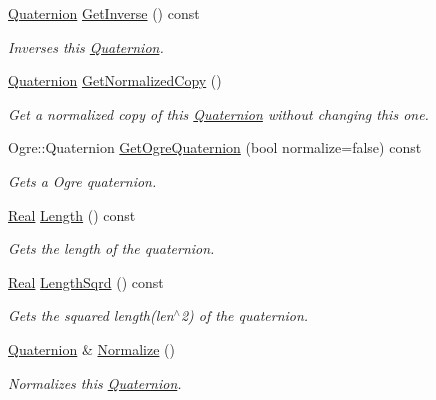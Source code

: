 \begin{DoxyCompactItemize}
\hyperlink{classMezzanine_1_1Quaternion}{Quaternion} \hyperlink{classMezzanine_1_1Quaternion_a37552234f4b725e17eedf584e011f36e}{GetInverse} () const 
\begin{DoxyCompactList}\small\item\em Inverses this \hyperlink{classMezzanine_1_1Quaternion}{Quaternion}. \item\end{DoxyCompactList}\item 
\hyperlink{classMezzanine_1_1Quaternion}{Quaternion} \hyperlink{classMezzanine_1_1Quaternion_ad5e76fba4c8b988be5865ec6ce2bbdd8}{GetNormalizedCopy} ()
\begin{DoxyCompactList}\small\item\em Get a normalized copy of this \hyperlink{classMezzanine_1_1Quaternion}{Quaternion} without changing this one. \item\end{DoxyCompactList}\item 
Ogre::Quaternion \hyperlink{classMezzanine_1_1Quaternion_a152abb6ccfe1c9dfb22218fd54b84863}{GetOgreQuaternion} (bool normalize=false) const 
\begin{DoxyCompactList}\small\item\em Gets a Ogre quaternion. \item\end{DoxyCompactList}\item 
\hyperlink{namespaceMezzanine_a726731b1a7df72bf3583e4a97282c6f6}{Real} \hyperlink{classMezzanine_1_1Quaternion_adb15aea643ea4b9ca1042209ac424fda}{Length} () const 
\begin{DoxyCompactList}\small\item\em Gets the length of the quaternion. \item\end{DoxyCompactList}\item 
\hyperlink{namespaceMezzanine_a726731b1a7df72bf3583e4a97282c6f6}{Real} \hyperlink{classMezzanine_1_1Quaternion_a3086b2ce64af221e8597cb9b0872d054}{LengthSqrd} () const 
\begin{DoxyCompactList}\small\item\em Gets the squared length(len$^\wedge$2) of the quaternion. \item\end{DoxyCompactList}\item 
\hyperlink{classMezzanine_1_1Quaternion}{Quaternion} \& \hyperlink{classMezzanine_1_1Quaternion_a284f73fe1354a2cf632f31ec83ee58ad}{Normalize} ()
\begin{DoxyCompactList}\small\item\em Normalizes this \hyperlink{classMezzanine_1_1Quaternion}{Quaternion}. \item\end{DoxyCompactList}\item 

\end{DoxyCompactItemize}
